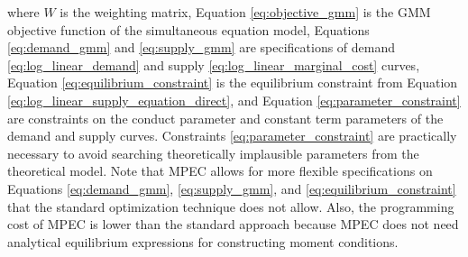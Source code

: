 \documentclass[11pt, a4paper]{article}
\begin{document}
where $W$ is the weighting matrix, Equation \eqref{eq:objective_gmm} is the GMM objective function of the simultaneous equation model, 
Equations \eqref{eq:demand_gmm} and \eqref{eq:supply_gmm} are specifications of demand \eqref{eq:log_linear_demand} and supply \eqref{eq:log_linear_marginal_cost} curves, 
Equation \eqref{eq:equilibrium_constraint} is the equilibrium constraint from Equation \eqref{eq:log_linear_supply_equation_direct}, and Equation \eqref{eq:parameter_constraint} are constraints on the conduct parameter and constant term parameters of the demand and supply curves. Constraints \eqref{eq:parameter_constraint} are practically necessary to avoid searching theoretically implausible parameters from the theoretical model. Note that MPEC allows for more flexible specifications on Equations \eqref{eq:demand_gmm}, \eqref{eq:supply_gmm}, and \eqref{eq:equilibrium_constraint} that the standard optimization technique does not allow. Also, the programming cost of MPEC is lower than the standard approach because MPEC does not need analytical equilibrium expressions for constructing moment conditions.
\end{document}
